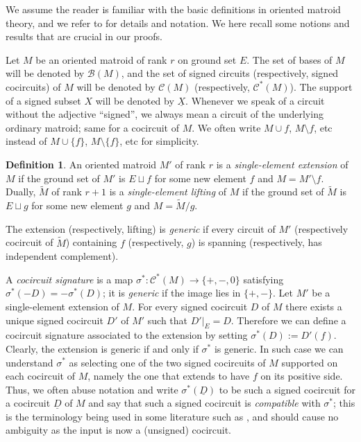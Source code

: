 \documentclass[12pt]{amsart}
\numberwithin{equation}{section}
\theoremstyle{definition}
\newtheorem{definition}[theorem]{Definition}
\newcommand{\Bcal}{{\mathcal B}}
\newcommand{\Ccal}{{\mathcal C}}
\newcommand{\paco}[1]{\todo[color=orange!30]{\footnotesize \rm #1 \\ \hfill --- P.}}
\begin{document}
We assume the reader is familiar with the basic definitions in oriented matroid theory, and we refer to \cite{BLSWZ_book} for details and notation. 
We here recall some notions and results that are crucial in our proofs.

Let $M$ be an oriented matroid of rank $r$ on ground set $E$. The set of bases of $M$ will be denoted by $\Bcal(M)$, and the set of signed circuits (respectively, signed cocircuits) of $M$ will be denoted by $\Ccal(M)$ (respectively, $\Ccal^*(M)$). The support of a signed subset $X$ will be denoted by $\underline{X}$. Whenever we speak of a circuit without the adjective ``signed'', we always mean a circuit of the underlying ordinary matroid; same for a cocircuit of $M$. We often write $M\cup f$, $M\setminus f$, etc instead of $M\cup\{f\}$, $M\setminus\{f\}$, etc for simplicity.

\begin{definition}
An oriented matroid $M'$ of rank $r$ is a {\em single-element extension} of $M$ if the ground set of $M'$ is $E\sqcup f$ for some new element $f$ and $M=M'\setminus f$. Dually, $\widetilde{M}$ of rank $r+1$ is a {\em single-element lifting} of $M$ if the ground set of $\widetilde{M}$ is $E\sqcup g$ for some new element $g$ and $M=\widetilde{M}/g$.

The extension (respectively, lifting) is \emph{generic} if every circuit of $M'$ (respectively cocircuit of $\widetilde M$) containing $f$ (respectively, $g$) is spanning (respectively, has independent complement). 


\end{definition}

A {\em cocircuit signature} is a map ${\sigma}^*:\Ccal^*(M)\rightarrow\{+,-,0\}$ satisfying $\sigma^*(-D)=-\sigma^*(D)$; it is {\em generic} if the image lies in $\{+,-\}$.
Let $M'$ be a single-element extension of $M$. For every signed cocircuit $D$ of $M$ there exists a unique signed cocircuit $D'$ of $M'$ such that $D'|_E=D$. Therefore we can define a cocircuit signature associated to the extension by setting ${\sigma}^*(D):=D'(f)$. Clearly, the extension is generic if and only if $\sigma^*$ is generic. In such case we can understand ${\sigma}^*$ 
as selecting one of the two signed cocircuits of $M$ supported on each cocircuit of $M$, namely the one that extends to have $f$ on its positive side.
Thus, we often abuse notation and write $\sigma^*(\underline{D})$ to be such a signed cocircuit for a cocircuit $\underline{D}$ of $M$ and say that such a signed cocircuit is {\em compatible} with $\sigma^*$; this is the terminology being used in some literature such as \cite{BBY, Ding_GB, Ding_GB2}, and should cause no ambiguity as the input is now a (unsigned) cocircuit.
\end{document}
